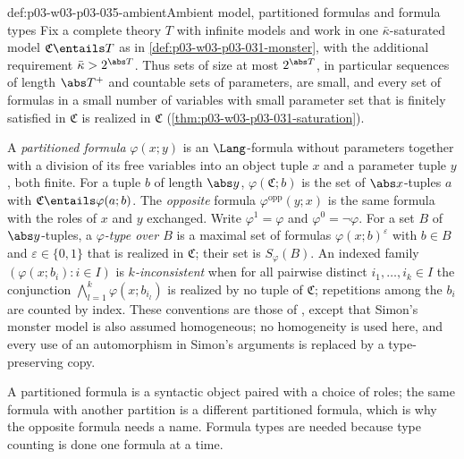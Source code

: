 \begin{hbconvention}{def:p03-w03-p03-035-ambient}{Ambient model, partitioned formulas and formula types}
Fix a complete theory \(T\) with infinite models and work in one
\(\bar\kappa\)-saturated model \(\mathfrak C\entails T\) as in
\cref{def:p03-w03-p03-031-monster}, with the additional requirement
\(\bar\kappa>2^{\abs T}\).  Thus sets of size at most \(2^{\abs T}\), in
particular sequences of length \(\abs T^+\) and countable sets of parameters,
are small, and every set of formulas in a small number of variables with
small parameter set that is finitely satisfied in \(\mathfrak C\) is realized
in \(\mathfrak C\) (\cref{thm:p03-w03-p03-031-saturation}).

A \emph{partitioned formula} \(\varphi(x;y)\) is an \(\Lang\)-formula without
parameters together with a division of its free variables into an object
tuple \(x\) and a parameter tuple \(y\), both finite.  For a tuple \(b\) of
length \(\abs y\), \(\varphi(\mathfrak C;b)\) is the set of \(\abs x\)-tuples
\(a\) with \(\mathfrak C\entails\varphi(a;b)\).  The \emph{opposite} formula
\(\varphi^{\mathrm{opp}}(y;x)\) is the same formula with the roles of \(x\)
and \(y\) exchanged.  Write \(\varphi^1=\varphi\) and
\(\varphi^0=\neg\varphi\).  For a set \(B\) of \(\abs y\)-tuples, a
\emph{\(\varphi\)-type over \(B\)} is a maximal set of formulas
\(\varphi(x;b)^{\varepsilon}\) with \(b\in B\) and
\(\varepsilon\in\{0,1\}\) that is realized in \(\mathfrak C\); their set is
\(S_\varphi(B)\).  An indexed family \((\varphi(x;b_i):i\in I)\) is
\emph{\(k\)-inconsistent} when for all pairwise distinct
\(i_1,\ldots,i_k\in I\) the conjunction
\(\bigwedge_{l=1}^{k}\varphi(x;b_{i_l})\) is realized by no tuple of
\(\mathfrak C\); repetitions among the \(b_i\) are counted by index.  These
conventions are those of
\cite[Section~1.1, pp.~10--11]{Simon2015GuideManuscript}, except that
Simon's monster model is also assumed homogeneous; no homogeneity is used
here, and every use of an automorphism in Simon's arguments is replaced by a
type-preserving copy.
\end{hbconvention}

A partitioned formula is a syntactic object paired with a choice of roles;
the same formula with another partition is a different partitioned formula,
which is why the opposite formula needs a name.  Formula types are needed
because type counting is done one formula at a time.

